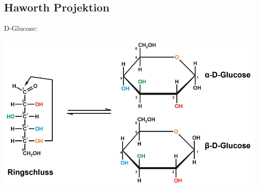 \subsection{Haworth Projektion}
\label{sec:haworth}
D-Glucose:

\includegraphics[scale=0.86]{media/naturstoffe/haworth.png}

